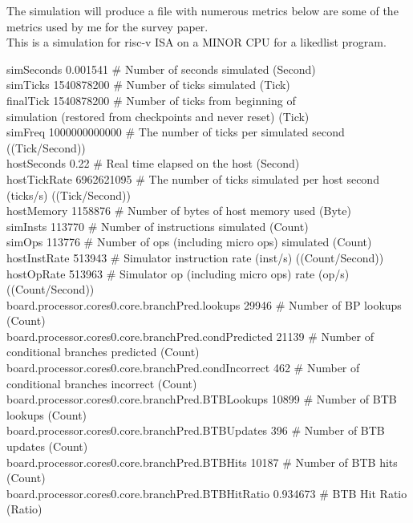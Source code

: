 The simulation will produce a file with numerous metrics below are some of the metrics used by me for the survey paper.\\
This is a simulation for risc-v ISA on a MINOR CPU for a  likedlist program. 

simSeconds      0.001541 \# Number of seconds simulated (Second)\\
simTicks      1540878200 \# Number of ticks simulated (Tick)\\
finalTick     1540878200 \# Number of ticks from beginning of \\simulation (restored from checkpoints and never reset) (Tick)\\
simFreq     1000000000000 \# The number of ticks per simulated second ((Tick/Second))\\
hostSeconds         0.22 \# Real time elapsed on the host (Second)\\
hostTickRate  6962621095 \# The number of ticks simulated per host second (ticks/s) ((Tick/Second))\\
hostMemory       1158876 \# Number of bytes of host memory used (Byte)\\
simInsts          113770 \# Number of instructions simulated (Count)\\
simOps            113776 \# Number of ops (including micro ops) simulated (Count)\\
hostInstRate      513943 \# Simulator instruction rate (inst/s) ((Count/Second))\\
hostOpRate        513963 \# Simulator op (including micro ops) rate (op/s) ((Count/Second))\\
board.processor.cores0.core.branchPred.lookups        29946 \# Number of BP lookups (Count)\\
board.processor.cores0.core.branchPred.condPredicted  21139 \# Number of conditional branches predicted (Count)\\
board.processor.cores0.core.branchPred.condIncorrect  462 \# Number of conditional branches incorrect (Count)\\
board.processor.cores0.core.branchPred.BTBLookups     10899 \# Number of BTB lookups (Count)\\
board.processor.cores0.core.branchPred.BTBUpdates     396 \# Number of BTB updates (Count)\\
board.processor.cores0.core.branchPred.BTBHits        10187 \# Number of BTB hits (Count)\\
board.processor.cores0.core.branchPred.BTBHitRatio    0.934673 \# BTB Hit Ratio (Ratio)\\
